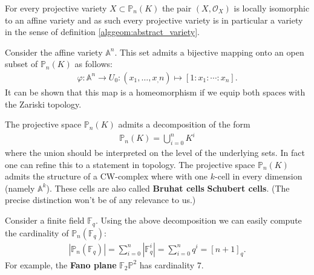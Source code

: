 {{    \begin{property}[Variety]
        For every projective variety $X\subset\mathbb{P}_n(K)$ the pair $(X, \mathcal{O}_X)$ is locally isomorphic to an affine variety and as such every projective variety is in particular a variety in the sense of definition \ref{alggeom:abstract_variety}.
    \end{property}
    \begin{property}
        Consider the affine variety $\mathbb{A}^n$. This set admits a bijective mapping onto an open subset of $\mathbb{P}_n(K)$ as follows:
        \begin{gather}
            \varphi:\mathbb{A}^n\rightarrow U_0:(x_1,\ldots,x_,n)\mapsto[1:x_1:\cdots:x_n].
        \end{gather}
        It can be shown that this map is a homeomorphism if we equip both spaces with the Zariski topology.
    \end{property}

    \begin{property}
        The projective space $\mathbb{P}_n(K)$ admits a decomposition of the form
        \begin{gather}
            \mathbb{P}_n(K) = \bigcup_{i=0}^n K^i
        \end{gather}
        where the union should be interpreted on the level of the underlying sets. In fact one can refine this to a statement in topology. The projective space $\mathbb{P}_n(K)$ admits the structure of a CW-complex where with one $k$-cell in every dimension (namely $\mathbb{A}^k$). These cells are also called \textbf{Bruhat cells} \textbf{Schubert cells}. (The precise distinction won't be of any relevance to us.)
    \end{property}

    \begin{example}
        Consider a finite field $\mathbb{F}_q$. Using the above decomposition we can easily compute the cardinality of $\mathbb{P}_n(\mathbb{F}_q)$:
        \begin{gather*}
            |\mathbb{P}_n(\mathbb{F}_q)| = \sum_{i=0}^n|\mathbb{F}_q^i| = \sum_{i=0}^nq^i = [n+1]_q.
        \end{gather*}
        For example, the \textbf{Fano plane} $\mathbb{F}_2\mathbb{P}^2$ has cardinality 7.
    \end{example}

}}
